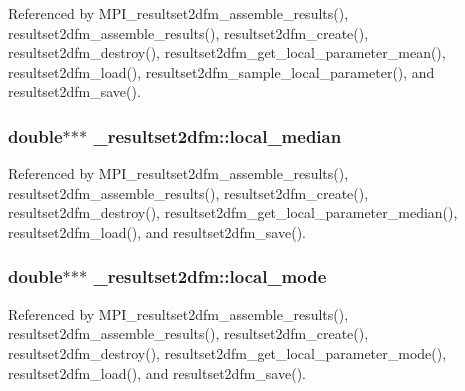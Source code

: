 Referenced by M\+P\+I\+\_\+resultset2dfm\+\_\+assemble\+\_\+results(), resultset2dfm\+\_\+assemble\+\_\+results(), resultset2dfm\+\_\+create(), resultset2dfm\+\_\+destroy(), resultset2dfm\+\_\+get\+\_\+local\+\_\+parameter\+\_\+mean(), resultset2dfm\+\_\+load(), resultset2dfm\+\_\+sample\+\_\+local\+\_\+parameter(), and resultset2dfm\+\_\+save().

\subsubsection[{\texorpdfstring{local\+\_\+median}{local_median}}]{\setlength{\rightskip}{0pt plus 5cm}double$\ast$$\ast$$\ast$ \+\_\+resultset2dfm\+::local\+\_\+median}\hypertarget{struct__resultset2dfm_a2aa671193fbb38759ae2069b096ce3c0}{}\label{struct__resultset2dfm_a2aa671193fbb38759ae2069b096ce3c0}


Referenced by M\+P\+I\+\_\+resultset2dfm\+\_\+assemble\+\_\+results(), resultset2dfm\+\_\+assemble\+\_\+results(), resultset2dfm\+\_\+create(), resultset2dfm\+\_\+destroy(), resultset2dfm\+\_\+get\+\_\+local\+\_\+parameter\+\_\+median(), resultset2dfm\+\_\+load(), and resultset2dfm\+\_\+save().

\subsubsection[{\texorpdfstring{local\+\_\+mode}{local_mode}}]{\setlength{\rightskip}{0pt plus 5cm}double$\ast$$\ast$$\ast$ \+\_\+resultset2dfm\+::local\+\_\+mode}\hypertarget{struct__resultset2dfm_a7ef13535ec30b0d2a6f83a56ba89696d}{}\label{struct__resultset2dfm_a7ef13535ec30b0d2a6f83a56ba89696d}


Referenced by M\+P\+I\+\_\+resultset2dfm\+\_\+assemble\+\_\+results(), resultset2dfm\+\_\+assemble\+\_\+results(), resultset2dfm\+\_\+create(), resultset2dfm\+\_\+destroy(), resultset2dfm\+\_\+get\+\_\+local\+\_\+parameter\+\_\+mode(), resultset2dfm\+\_\+load(), and resultset2dfm\+\_\+save().

